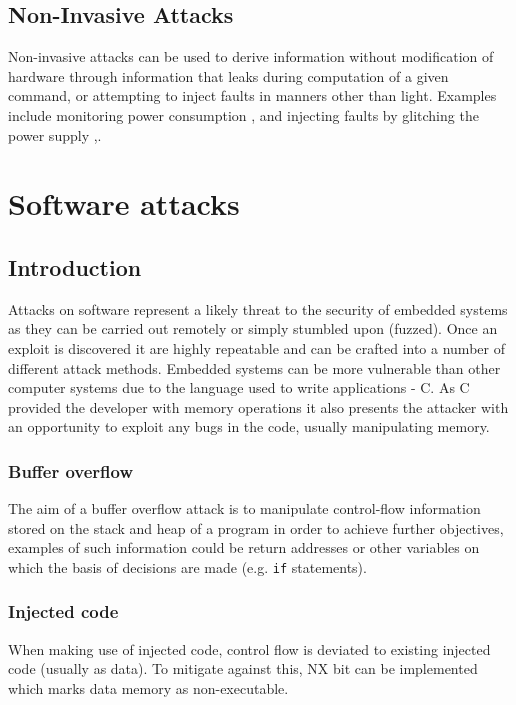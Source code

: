 \subsection{Non-Invasive Attacks}
Non-invasive attacks can be used to derive information without modification of hardware through information that leaks during computation of a given command, or attempting to inject faults in manners other than light. Examples include monitoring power consumption \cite{Maurer1999},\cite{MangardStefan2007Paa:} and injecting faults by glitching the power supply \cite{Anderson1996},\cite{Bar-el2006}.

\section{Software attacks}

\subsection{Introduction}

Attacks on software represent a likely threat to the security of embedded systems as they can be carried out remotely or simply stumbled upon (fuzzed). Once an exploit is discovered it are highly repeatable and can be crafted into a number of different attack methods. Embedded systems can be more vulnerable than other computer systems due to the language used to write applications - C. As C provided the developer with memory operations it also presents the attacker with an opportunity to exploit any bugs in the code, usually manipulating memory.

\subsubsection{Buffer overflow}

The aim of a buffer overflow attack is to manipulate control-flow information stored on the stack and heap of a program in order to achieve further objectives, examples of such information could be return addresses or other variables on which the basis of decisions are made (e.g. \verb|if| statements).

\subsubsection{Injected code}

When making use of injected code, control flow is deviated to existing injected code (usually as data). To mitigate against this, NX bit can be implemented which marks data memory as non-executable.

